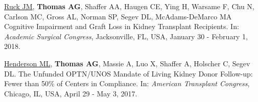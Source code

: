 \documentclass[10pt]{article}
\makeatletter
\newlength{\bibhang}
\newlength{\bibsep}
 {\@listi \global\bibsep\itemsep \global\advance\bibsep by\parsep}
\newenvironment{bibenum*}
  {\renewcommand\labelenumi{[\theenumi]}%
   \etaremune[
     topsep=0pt,
     itemsep=\bibsep,
     parsep=0pt,partopsep=0pt,
     itemindent=-\bibhang,
     leftmargin={\bibhang+\widthof{[999]}}]}
  {\endetaremune}
\makeatother
\begin{document}
\begin{bibenum*}




\item \underline{Ruck JM\dag}, \textbf{Thomas AG\dag}, Shaffer AA,
  Haugen CE, Ying H, Warsame F, Chu N, Carlson MC, Gross AL,
  Norman SP, Segev DL, McAdams-DeMarco MA
  Cognitive Impairment and Graft Loss
  in Kidney Transplant Recipients.
  In: \emph{Academic Surgical Congress},
  Jacksonville, FL, USA, January 30 - February 1, 2018.



\item \underline{Henderson ML\dag}, \textbf{Thomas AG\dag}, Massie A,
  Luo X, Shaffer A, Holscher C, Segev DL.
  The Unfunded OPTN/UNOS Mandate of Living Kidney Donor Follow-up:
  Fewer than 50\% of Centers in Compliance.
  In: \emph{American Transplant Congress},
  Chicago, IL, USA, April 29 - May 3, 2017.

\end{bibenum*}
\end{document}
